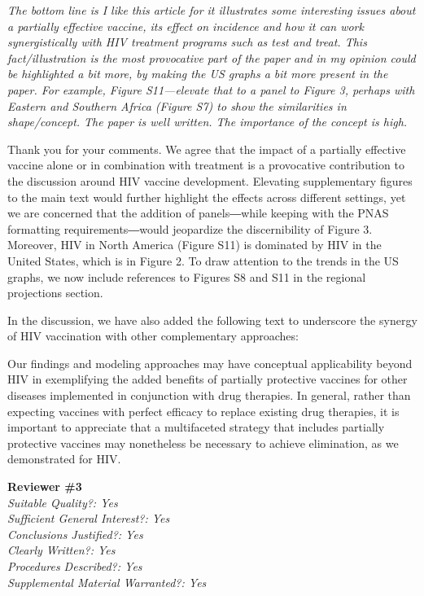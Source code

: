 \documentclass[12pt]{jpmletter}
\newcommand{\section}[1]{\textbf{#1}\\}
\newenvironment{original}{\it}{}
\begin{document}
\begin{letter}{}
\begin{original}
      The bottom line is I like this article for it illustrates some
      interesting issues about a partially effective vaccine, its
      effect on incidence and how it can work synergistically with HIV
      treatment programs such as test and treat. This
      fact/illustration is the most provocative part of the paper and
      in my opinion could be highlighted a bit more, by making the US
      graphs a bit more present in the paper. For example, Figure
      S11—elevate that to a panel to Figure 3, perhaps with Eastern
      and Southern Africa (Figure S7) to show the similarities in
      shape/concept. The paper is well written. The importance of the
      concept is high.
    \end{original}
    
    Thank you for your comments. We agree that the impact of a
    partially effective vaccine alone or in combination with treatment
    is a provocative contribution to the discussion around HIV vaccine
    development. Elevating supplementary figures to the main text
    would further highlight the effects across different settings, yet
    we are concerned that the addition of panels―while keeping with
    the PNAS formatting requirements―would jeopardize the
    discernibility of Figure 3. Moreover, HIV in North America (Figure
    S11) is dominated by HIV in the United States, which is in Figure
    2. To draw attention to the trends in the US graphs, we now
    include references to Figures S8 and S11 in the regional
    projections section.

    In the discussion, we have also added the following text to
    underscore the synergy of HIV vaccination with other complementary
    approaches:
    \begin{quoting}
      Our findings and modeling approaches may have conceptual
      applicability beyond HIV in exemplifying the added benefits of
      partially protective vaccines for other diseases implemented in
      conjunction with drug therapies. In general, rather than
      expecting vaccines with perfect efficacy to replace existing
      drug therapies, it is important to appreciate that a
      multifaceted strategy that includes partially protective
      vaccines may nonetheless be necessary to achieve elimination, as
      we demonstrated for HIV.
    \end{quoting}
    
    \section{Reviewer \#3}
    \begin{original}
      Suitable Quality?: Yes\\
      Sufficient General Interest?: Yes\\
      Conclusions Justified?: Yes\\
      Clearly Written?: Yes\\
      Procedures Described?: Yes\\
      Supplemental Material Warranted?: Yes 


\end{original}
\end{letter}
\end{document}
